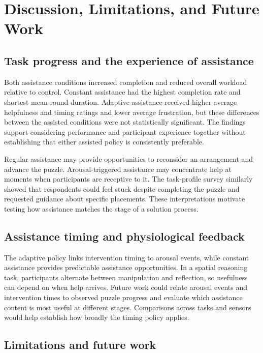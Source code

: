 \documentclass[sigconf,anonymous]{aamas}
\begin{document}
\section{Discussion, Limitations, and Future Work}

\subsection{Task progress and the experience of assistance}

Both assistance conditions increased completion and reduced overall workload relative to control. Constant assistance had the highest completion rate and shortest mean round duration. Adaptive assistance received higher average helpfulness and timing ratings and lower average frustration, but these differences between the assisted conditions were not statistically significant. The findings support considering performance and participant experience together without establishing that either assisted policy is consistently preferable.

Regular assistance may provide opportunities to reconsider an arrangement and advance the puzzle. Arousal-triggered assistance may concentrate help at moments when participants are receptive to it. The task-profile survey similarly showed that respondents could feel stuck despite completing the puzzle and requested guidance about specific placements. These interpretations motivate testing how assistance matches the stage of a solution process.

\subsection{Assistance timing and physiological feedback}

The adaptive policy links intervention timing to arousal events, while constant assistance provides predictable assistance opportunities. In a spatial reasoning task, participants alternate between manipulation and reflection, so usefulness can depend on when help arrives. Future work could relate arousal events and intervention times to observed puzzle progress and evaluate which assistance content is most useful at different stages. Comparisons across tasks and sensors would help establish how broadly the timing policy applies.

\subsection{Limitations and future work}
\end{document}
